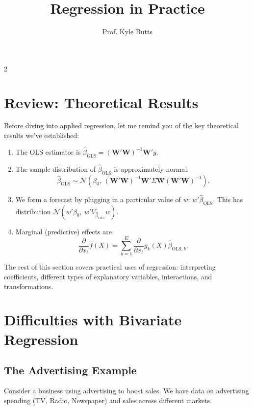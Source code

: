 \documentclass[12pt]{article}
\title{Regression in Practice}
\author{Prof. Kyle Butts}
\date{}
\begin{document}
\maketitle
\begin{multicols}{2}

  \section*{Review: Theoretical Results}

  Before diving into applied regression, let me remind you of the key theoretical results we've established:

  \begin{enumerate}
    \item The OLS estimator is $\hat{\beta}_{\text{OLS}} = (\bm{W}' \bm{W})^{-1} \bm{W}' y$.

      \smallskip
    \item The sample distribution of $\hat{\beta}_{\text{OLS}}$ is approximately normal:
      $$\hat{\beta}_{\text{OLS}} \sim \mathcal{N}\left(\beta_0, \ (\bm{W}' \bm{W})^{-1} \bm{W}' \Sigma \bm{W} (\bm{W}' \bm{W})^{-1}\right).$$

      \smallskip
    \item We form a forecast by plugging in a particular value of $w$: $w' \hat{\beta}_{\text{OLS}}$. 
    This has distribution $\mathcal{N}(w' \beta_0, \ w' V_{\hat{\beta}_{\text{OLS}}} w)$.

      \smallskip
    \item Marginal (predictive) effects are $$\frac{\partial}{\partial x_\ell} \hat{f}(X) = \sum_{k=1}^K \frac{\partial}{\partial x_\ell} g_{k}(X) \hat{\beta}_{\text{OLS}, k}.$$
  \end{enumerate}

  The rest of this section covers practical uses of regression: interpreting coefficients, different types of explanatory variables, interactions, and transformations.

  \section*{Difficulties with Bivariate Regression}

  \subsection*{The Advertising Example}

  Consider a business using advertising to boost sales. We have data on advertising spending (TV, Radio, Newspaper) and sales across different markets.


\end{multicols}
\end{document}
